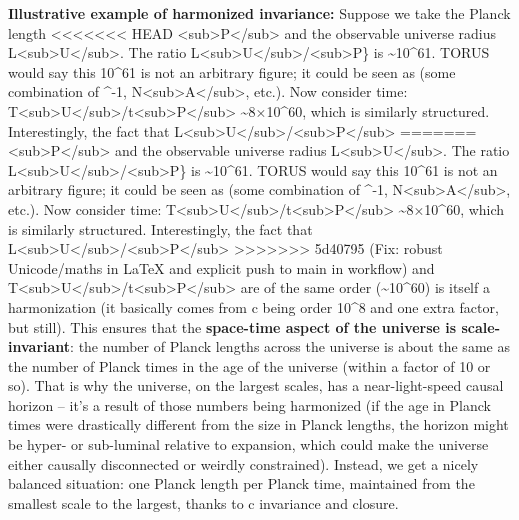 \documentclass[]{article}
\begin{document}
\textbf{Illustrative example of harmonized invariance:} Suppose we take
the Planck length
<<<<<<< HEAD
\ell\textless sub\textgreater P\textless/sub\textgreater{} and the
observable universe radius
L\textless sub\textgreater U\textless/sub\textgreater. The ratio
L\textless sub\textgreater U\textless/sub\textgreater/\ell\textless sub\textgreater P\}
is \textasciitilde10\^{}61. TORUS would say this 10\^{}61 is not an
arbitrary figure; it could be seen as (some combination of \alpha\^{}-1,
N\textless sub\textgreater A\textless/sub\textgreater, etc.). Now
consider time:
T\textless sub\textgreater U\textless/sub\textgreater/t\textless sub\textgreater P\textless/sub\textgreater{}
\textasciitilde8×10\^{}60, which is similarly structured. Interestingly,
the fact that
L\textless sub\textgreater U\textless/sub\textgreater/\ell\textless sub\textgreater P\textless/sub\textgreater{}
=======
\ell\textless{}sub\textgreater{}P\textless{}/sub\textgreater{} and the
observable universe radius
L\textless{}sub\textgreater{}U\textless{}/sub\textgreater{}. The ratio
L\textless{}sub\textgreater{}U\textless{}/sub\textgreater{}/\ell\textless{}sub\textgreater{}P\}
is \textasciitilde{}10\^{}61. TORUS would say this 10\^{}61 is not an
arbitrary figure; it could be seen as (some combination of \alpha\^{}-1,
N\textless{}sub\textgreater{}A\textless{}/sub\textgreater{}, etc.). Now
consider time:
T\textless{}sub\textgreater{}U\textless{}/sub\textgreater{}/t\textless{}sub\textgreater{}P\textless{}/sub\textgreater{}
\textasciitilde{}8×10\^{}60, which is similarly structured.
Interestingly, the fact that
L\textless{}sub\textgreater{}U\textless{}/sub\textgreater{}/\ell\textless{}sub\textgreater{}P\textless{}/sub\textgreater{}
>>>>>>> 5d40795 (Fix: robust Unicode/maths in LaTeX and explicit push to main in workflow)
and
T\textless{}sub\textgreater{}U\textless{}/sub\textgreater{}/t\textless{}sub\textgreater{}P\textless{}/sub\textgreater{}
are of the same order (\textasciitilde{}10\^{}60) is itself a
harmonization (it basically comes from c being order 10\^{}8 and one
extra factor, but still). This ensures that the \textbf{space-time
aspect of the universe is scale-invariant}: the number of Planck lengths
across the universe is about the same as the number of Planck times in
the age of the universe (within a factor of 10 or so). That is why the
universe, on the largest scales, has a near-light-speed causal horizon
-- it's a result of those numbers being harmonized (if the age in Planck
times were drastically different from the size in Planck lengths, the
horizon might be hyper- or sub-luminal relative to expansion, which
could make the universe either causally disconnected or weirdly
constrained). Instead, we get a nicely balanced situation: one Planck
length per Planck time, maintained from the smallest scale to the
largest, thanks to c invariance and closure​.
\end{document}
